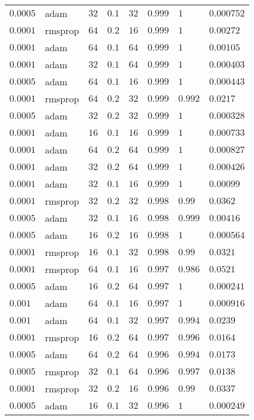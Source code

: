\begin{table}[tbp]
\begin{tabular}{llllllll}
$0.0005$ & adam & $32$ & $0.1$ & $32$ & $0.999$ & $1$ & $0.000752$ \\
$0.0001$ & rmsprop & $64$ & $0.2$ & $16$ & $0.999$ & $1$ & $0.00272$ \\
$0.0001$ & adam & $64$ & $0.1$ & $64$ & $0.999$ & $1$ & $0.00105$ \\
$0.0001$ & adam & $32$ & $0.1$ & $64$ & $0.999$ & $1$ & $0.000403$ \\
$0.0005$ & adam & $64$ & $0.1$ & $16$ & $0.999$ & $1$ & $0.000443$ \\
$0.0001$ & rmsprop & $64$ & $0.2$ & $32$ & $0.999$ & $0.992$ & $0.0217$ \\
$0.0005$ & adam & $32$ & $0.2$ & $32$ & $0.999$ & $1$ & $0.000328$ \\
$0.0001$ & adam & $16$ & $0.1$ & $16$ & $0.999$ & $1$ & $0.000733$ \\
$0.0001$ & adam & $64$ & $0.2$ & $64$ & $0.999$ & $1$ & $0.000827$ \\
$0.0001$ & adam & $32$ & $0.2$ & $64$ & $0.999$ & $1$ & $0.000426$ \\
$0.0001$ & adam & $32$ & $0.1$ & $16$ & $0.999$ & $1$ & $0.00099$ \\
$0.0001$ & rmsprop & $32$ & $0.2$ & $32$ & $0.998$ & $0.99$ & $0.0362$ \\
$0.0005$ & adam & $32$ & $0.1$ & $16$ & $0.998$ & $0.999$ & $0.00416$ \\
$0.0005$ & adam & $16$ & $0.2$ & $16$ & $0.998$ & $1$ & $0.000564$ \\
$0.0001$ & rmsprop & $16$ & $0.1$ & $32$ & $0.998$ & $0.99$ & $0.0321$ \\
$0.0001$ & rmsprop & $64$ & $0.1$ & $16$ & $0.997$ & $0.986$ & $0.0521$ \\
$0.0005$ & adam & $16$ & $0.2$ & $64$ & $0.997$ & $1$ & $0.000241$ \\
$0.001$ & adam & $64$ & $0.1$ & $16$ & $0.997$ & $1$ & $0.000916$ \\
$0.001$ & adam & $64$ & $0.1$ & $32$ & $0.997$ & $0.994$ & $0.0239$ \\
$0.0001$ & rmsprop & $16$ & $0.2$ & $64$ & $0.997$ & $0.996$ & $0.0164$ \\
$0.0005$ & adam & $64$ & $0.2$ & $64$ & $0.996$ & $0.994$ & $0.0173$ \\
$0.0005$ & rmsprop & $32$ & $0.1$ & $64$ & $0.996$ & $0.997$ & $0.0138$ \\
$0.0001$ & rmsprop & $32$ & $0.2$ & $16$ & $0.996$ & $0.99$ & $0.0337$ \\
$0.0005$ & adam & $16$ & $0.1$ & $32$ & $0.996$ & $1$ & $0.000249$ \\

\end{tabular}
\end{table}
